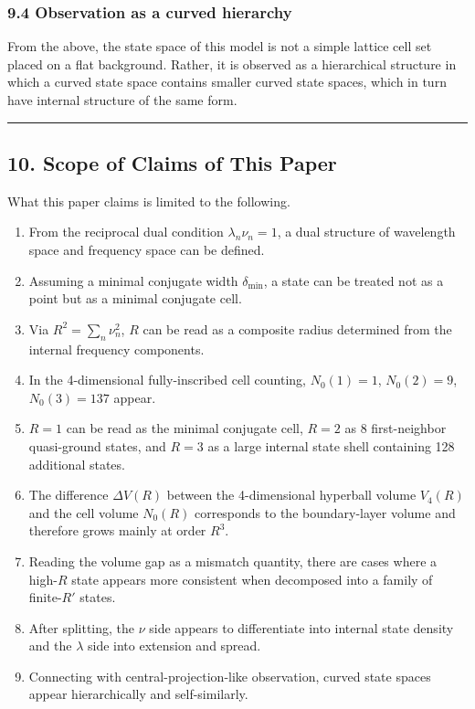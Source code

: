 \documentclass[
]{article}
\providecommand{\tightlist}{%
  \setlength{\itemsep}{0pt}\setlength{\parskip}{0pt}}
\begin{document}
\subsubsection{9.4 Observation as a curved
hierarchy}\label{observation-as-a-curved-hierarchy}

From the above, the state space of this model is not a simple lattice
cell set placed on a flat background. Rather, it is observed as a
hierarchical structure in which a curved state space contains smaller
curved state spaces, which in turn have internal structure of the same
form.

\begin{center}\rule{0.5\linewidth}{0.5pt}\end{center}

\subsection{10. Scope of Claims of This
Paper}\label{scope-of-claims-of-this-paper}

What this paper claims is limited to the following.

\begin{enumerate}
\def\labelenumi{\arabic{enumi}.}
\tightlist
\item
  From the reciprocal dual condition \(\lambda_n\nu_n=1\), a dual
  structure of wavelength space and frequency space can be defined.
\item
  Assuming a minimal conjugate width \(\delta_{\min}\), a state can be
  treated not as a point but as a minimal conjugate cell.
\item
  Via \(R^2=\sum_n\nu_n^2\), \(R\) can be read as a composite radius
  determined from the internal frequency components.
\item
  In the 4-dimensional fully-inscribed cell counting, \(N_0(1)=1\),
  \(N_0(2)=9\), \(N_0(3)=137\) appear.
\item
  \(R=1\) can be read as the minimal conjugate cell, \(R=2\) as 8
  first-neighbor quasi-ground states, and \(R=3\) as a large internal
  state shell containing 128 additional states.
\item
  The difference \(\Delta V(R)\) between the 4-dimensional hyperball
  volume \(V_4(R)\) and the cell volume \(N_0(R)\) corresponds to the
  boundary-layer volume and therefore grows mainly at order \(R^3\).
\item
  Reading the volume gap as a mismatch quantity, there are cases where a
  high-\(R\) state appears more consistent when decomposed into a family
  of finite-\(R'\) states.
\item
  After splitting, the \(\nu\) side appears to differentiate into
  internal state density and the \(\lambda\) side into extension and
  spread.
\item
  Connecting with central-projection-like observation, curved state
  spaces appear hierarchically and self-similarly.
\end{enumerate}
\end{document}
